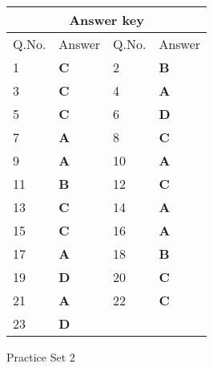 \begin{table}[H]
	\centering
	\begin{tabular}{|p{1.5cm}|p{1.5cm}||p{1.5cm}|p{1.5cm}|}
		\hline
		\multicolumn{4}{|c|}{\textbf{Answer key}}\\\hline\hline
		\rowcolor{ocrel}Q.No.&Answer&Q.No.&Answer\\\hline
		1&\textbf{C} &2&\textbf{B}\\\hline 
		3&\textbf{C} &4&\textbf{A} \\\hline
		5&\textbf{C} &6&\textbf{D} \\\hline
		7&\textbf{A}&8&\textbf{C}\\\hline
		9&\textbf{A}&10&\textbf{A}\\\hline
		11&\textbf{B} &12&\textbf{C}\\\hline
		13&\textbf{C}&14&\textbf{A}\\\hline
		15&\textbf{C} &16&\textbf{A} \\\hline
		17&\textbf{A}&18&\textbf{B}\\\hline
		19&\textbf{D}&20&\textbf{C}\\\hline
		21&\textbf{A} &22&\textbf{C}\\\hline
		23&\textbf{D} &&\textbf{} \\\hline
	\end{tabular}
\end{table}
\newpage
\begin{abox}
	Practice Set 2 
\end{abox}
